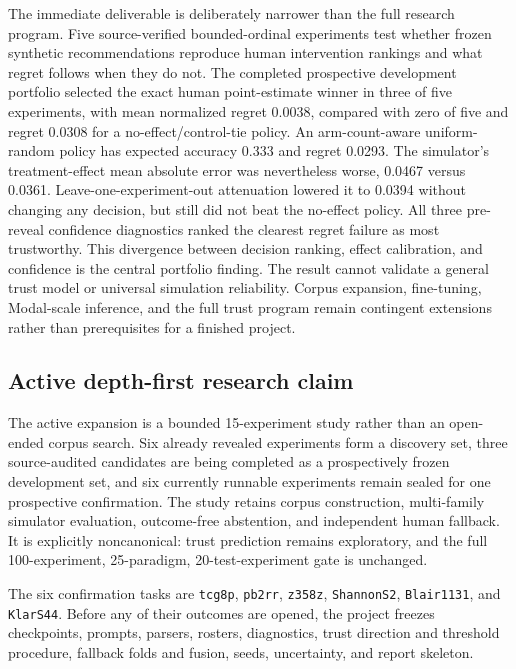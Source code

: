 \documentclass[11pt]{article}
\begin{document}
The immediate deliverable is deliberately narrower than the full research program. Five source-verified bounded-ordinal experiments test whether frozen synthetic recommendations reproduce human intervention rankings and what regret follows when they do not. The completed prospective development portfolio selected the exact human point-estimate winner in three of five experiments, with mean normalized regret 0.0038, compared with zero of five and regret 0.0308 for a no-effect/control-tie policy. An arm-count-aware uniform-random policy has expected accuracy 0.333 and regret 0.0293. The simulator's treatment-effect mean absolute error was nevertheless worse, 0.0467 versus 0.0361. Leave-one-experiment-out attenuation lowered it to 0.0394 without changing any decision, but still did not beat the no-effect policy. All three pre-reveal confidence diagnostics ranked the clearest regret failure as most trustworthy. This divergence between decision ranking, effect calibration, and confidence is the central portfolio finding. The result cannot validate a general trust model or universal simulation reliability. Corpus expansion, fine-tuning, Modal-scale inference, and the full trust program remain contingent extensions rather than prerequisites for a finished project.

\subsection*{Active depth-first research claim}

The active expansion is a bounded 15-experiment study rather than an open-ended corpus search. Six already revealed experiments form a discovery set, three source-audited candidates are being completed as a prospectively frozen development set, and six currently runnable experiments remain sealed for one prospective confirmation. The study retains corpus construction, multi-family simulator evaluation, outcome-free abstention, and independent human fallback. It is explicitly noncanonical: trust prediction remains exploratory, and the full 100-experiment, 25-paradigm, 20-test-experiment gate is unchanged.

The six confirmation tasks are \texttt{tcg8p}, \texttt{pb2rr}, \texttt{z358z}, \texttt{ShannonS2}, \texttt{Blair1131}, and \texttt{KlarS44}. Before any of their outcomes are opened, the project freezes checkpoints, prompts, parsers, rosters, diagnostics, trust direction and threshold procedure, fallback folds and fusion, seeds, uncertainty, and report skeleton.
\end{document}
